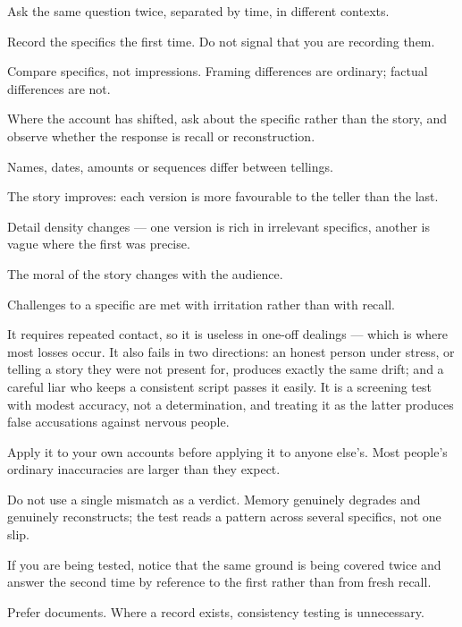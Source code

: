 \begin{application}
  \item Ask the same question twice, separated by time, in different contexts.
  \item Record the specifics the first time. Do not signal that you are recording them.
  \item Compare specifics, not impressions. Framing differences are ordinary; factual differences are not.
  \item Where the account has shifted, ask about the specific rather than the story, and observe whether the response is recall or reconstruction.
\end{application}

\begin{feedback}
  \item Names, dates, amounts or sequences differ between tellings.
  \item The story improves: each version is more favourable to the teller than the last.
  \item Detail density changes --- one version is rich in irrelevant specifics, another is vague where the first was precise.
  \item The moral of the story changes with the audience.
  \item Challenges to a specific are met with irritation rather than with recall.
\end{feedback}

\begin{failure}
It requires repeated contact, so it is useless in one-off dealings --- which is where most losses occur. It also fails in two directions: an honest person under stress, or telling a story they were not present for, produces exactly the same drift; and a careful liar who keeps a consistent script passes it easily. It is a screening test with modest accuracy, not a determination, and treating it as the latter produces false accusations against nervous people.
\end{failure}

\begin{countermeasures}
  \item Apply it to your own accounts before applying it to anyone else's. Most people's ordinary inaccuracies are larger than they expect.
  \item Do not use a single mismatch as a verdict. Memory genuinely degrades and genuinely reconstructs; the test reads a pattern across several specifics, not one slip.
  \item If you are being tested, notice that the same ground is being covered twice and answer the second time by reference to the first rather than from fresh recall.
  \item Prefer documents. Where a record exists, consistency testing is unnecessary.
\end{countermeasures}

\seesources
{}
